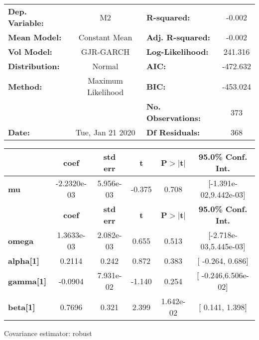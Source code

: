 \begin{center}
\begin{tabular}{lclc}
\toprule
\textbf{Dep. Variable:} &         M2         & \textbf{  R-squared:         } &    -0.002   \\
\textbf{Mean Model:}    &   Constant Mean    & \textbf{  Adj. R-squared:    } &    -0.002   \\
\textbf{Vol Model:}     &     GJR-GARCH      & \textbf{  Log-Likelihood:    } &    241.316  \\
\textbf{Distribution:}  &       Normal       & \textbf{  AIC:               } &   -472.632  \\
\textbf{Method:}        & Maximum Likelihood & \textbf{  BIC:               } &   -453.024  \\
\textbf{}               &                    & \textbf{  No. Observations:  } &    373      \\
\textbf{Date:}          &  Tue, Jan 21 2020  & \textbf{  Df Residuals:      } &    368      \\
\bottomrule
\end{tabular}
\begin{tabular}{lccccc}
            & \textbf{coef} & \textbf{std err} & \textbf{t} & \textbf{P$>$$|$t$|$} & \textbf{95.0\% Conf. Int.}  \\
\midrule
\textbf{mu} &  -2.2320e-03  &    5.956e-03     &    -0.375  &          0.708       &   [-1.391e-02,9.442e-03]    \\
                  & \textbf{coef} & \textbf{std err} & \textbf{t} & \textbf{P$>$$|$t$|$} & \textbf{95.0\% Conf. Int.}  \\
\midrule
\textbf{omega}    &   1.3633e-03  &    2.082e-03     &     0.655  &          0.513       &   [-2.718e-03,5.445e-03]    \\
\textbf{alpha[1]} &       0.2114  &        0.242     &     0.872  &          0.383       &     [ -0.264,  0.686]       \\
\textbf{gamma[1]} &      -0.0904  &    7.931e-02     &    -1.140  &          0.254       &    [ -0.246,6.506e-02]      \\
\textbf{beta[1]}  &       0.7696  &        0.321     &     2.399  &      1.642e-02       &     [  0.141,  1.398]       \\
\bottomrule
\end{tabular}
\end{center}

Covariance estimator: robust